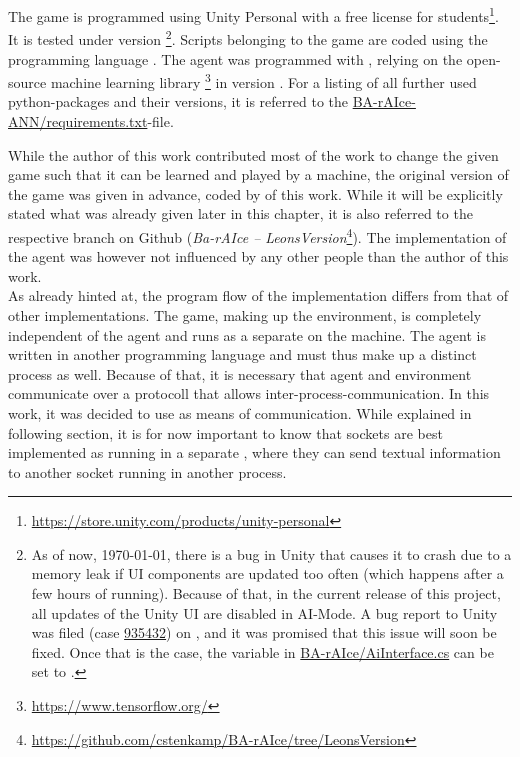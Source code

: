 The game is programmed using Unity Personal with a free license for students\footnote{\url{https://store.unity.com/products/unity-personal}}. It is tested under version \footnote{As of now, \today, there is a bug in Unity that causes it to crash due to a memory leak if UI components are updated too often (which happens after a few hours of running). Because of that, in the current release of this project, all updates of the Unity UI are disabled in AI-Mode. A bug report to Unity was filed (case \href{https://fogbugz.unity3d.com/default.asp?935432_h1bir10rkmbc658k}{935432}) on , and it was promised that this issue will soon be fixed. Once that is the case, the variable  in \href{https://github.com/cstenkamp/BA-rAIce/blob/ef2dc018f36cd9ad65df90e65d8ab840c822567e/Assets/Scripts/AiInterface.cs\#L12-L13}{BA-rAIce/AiInterface.cs} can be set to .}.
Scripts belonging to the game are coded using the programming language . The agent was programmed with , relying on the open-source machine learning library \cite{abadi_tensorflow:_2015}\footnote{\url{https://www.tensorflow.org/}} in version . For a listing of all further used python-packages and their versions, it is referred to the \href{https://github.com/cstenkamp/BA-rAIce-ANN/blob/master/requirements.txt}{BA-rAIce-ANN/requirements.txt}-file. 

While the author of this work contributed most of the work to change the given game such that it can be learned and played by a machine, the original version of the game was given in advance, coded by \leon of this work. While it will be explicitly stated what was already given later in this chapter, it is also referred to the respective branch on Github (\textit{Ba-rAIce -- LeonsVersion}\footnote{\url{https://github.com/cstenkamp/BA-rAIce/tree/LeonsVersion}}). The implementation of the agent was however not influenced by any other people than the author of this work.\\

\noindent As already hinted at, the program flow of the implementation differs from that of other implementations. The game, making up the environment, is completely independent of the agent and runs as a separate  on the machine. The agent is written in another programming language and must thus make up a distinct process as well. Because of that, it is necessary that agent and environment communicate over a protocoll that allows inter-process-communication. In this work, it was decided to use  as means of communication. While explained in following section, it is for now important to know that sockets are best implemented as running in a separate , where they can send textual information to another socket running in another process.

